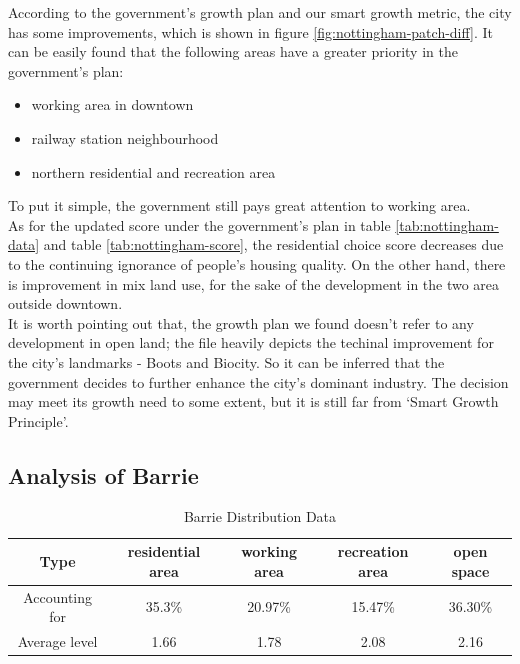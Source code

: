 According to the government's growth plan and our smart growth metric, the city has some improvements, which is shown in figure \ref{fig:nottingham-patch-diff}.
It can be easily found that the following areas have a greater priority in the government's plan:
\begin{itemize}
  \item working area in downtown
  \item railway station neighbourhood
  \item northern residential and recreation area
\end{itemize}
To put it simple, the government still pays great attention to working area.
\\
As for the updated score under the government's plan in table \ref{tab:nottingham-data} and table \ref{tab:nottingham-score}, the residential choice score decreases due to the continuing ignorance of people's housing quality.
On the other hand, there is improvement in mix land use, for the sake of the development in the two area outside downtown.
\\
It is worth pointing out that, the growth plan we found doesn't refer to any development in open land; the file heavily depicts the techinal improvement for the city's landmarks - Boots and Biocity.
So it can be inferred that the government decides to further enhance the city's dominant industry.
The decision may meet its growth need to some extent, but it is still far from `Smart Growth Principle'.

\subsection{Analysis of Barrie}
\begin{table}
  \begin{tabular}{c|cccc}
    \hline
    Type & residential area & working area & recreation area & open space \\
    \hline
    Accounting for & 35.3\% & 20.97\% & 15.47\% & 36.30\% \\
    \hline
    Average level & 1.66 & 1.78 & 2.08 & 2.16 \\
    \hline
  \end{tabular}
  \caption{Barrie Distribution Data}
  \label{tab:barrie-data}
\end{table}

